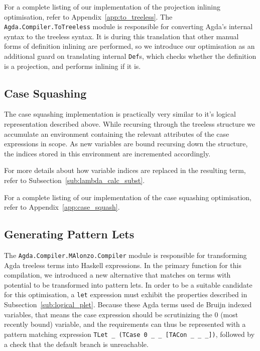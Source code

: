 For a complete listing of our implementation of the projection inlining optimisation, refer to Appendix~\ref{app:to_treeless}. The \lstinline{Agda.Compiler.ToTreeless} module is responsible for converting Agda's internal syntax to the treeless syntax. It is during this translation that other manual forms of definition inlining are performed, so we introduce our optimisation as an additional guard on translating internal \lstinline{Def}s, which checks whether the definition is a projection, and performs inlining if it  is.

\subsection{Case Squashing}

The case squashing implementation is practically very similar to it's logical representation described above. While recursing through the treeless structure we accumulate an environment containing the relevant attributes of the case expressions in scope. As new variables are bound recursing down the structure, the indices stored in this environment are incremented accordingly.

For more details about how variable indices are replaced in the resulting term, refer to Subsection~\ref{sub:lambda_calc_subst}.

For a complete listing of our implementation of the case squashing optimisation, refer to Appendix~\ref{app:case_squash}.

\subsection{Generating Pattern Lets}

The \lstinline{Agda.Compiler.MAlonzo.Compiler} module is responsible for transforming Agda treeless terms into Haskell expressions. In the primary function for this compilation, we introduced a new alternative that matches on terms with potential to be transformed into pattern lets. In order to be a suitable candidate for this optimisation, a \lstinline{let} expression must exhibit the properties described in Subsection~\ref{sub:logical_plet}. Because these Agda terms used de Bruijn indexed variables, that means the case expression should be scrutinizing the 0 (most recently bound) variable, and the requirements can thus be represented with a pattern matching expression \lstinline{TLet _ (TCase 0 _ _ [TACon _ _ _])}, followed by a check that the default branch is unreachable.

